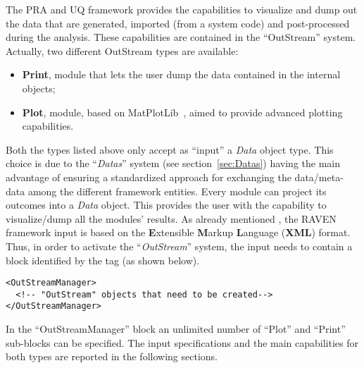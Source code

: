 The PRA and UQ framework provides the capabilities to visualize and dump out the
data that are generated, imported (from a system code) and post-processed during
the analysis.
%
These capabilities are contained in the ``OutStream'' system.
%
Actually, two different OutStream types are available:
\vspace{-5mm}
\begin{itemize}
  \itemsep0em
  \item \textbf{Print}, module that lets the user dump the data contained in the
  internal objects;
  \item \textbf{Plot}, module, based on MatPlotLib~\cite{MatPlotLib}, aimed to
  provide advanced plotting capabilities.
\end{itemize}
\vspace{-5mm}
Both the types listed above only accept as ``input'' a \textit{Data} object
type.
%
This choice is due to the ``\textit{Datas}'' system (see
section~\ref{sec:Datas}) having the main advantage of ensuring a standardized
approach for exchanging the data/meta-data among the different framework
entities.
%
Every module can project its outcomes into a \textit{Data} object.
%
This provides the user with the capability to visualize/dump all the modules'
results.
%
As already mentioned , the RAVEN
framework input is based on the \textbf{E}xtensible \textbf{M}arkup
\textbf{L}anguage (\textbf{XML}) format.
%
Thus, in order to activate the ``\textit{OutStream}'' system, the input needs to
contain a block identified by the  tag (as shown
below).

\begin{lstlisting}[style=XML]
<OutStreamManager>
  <!-- "OutStream" objects that need to be created-->
</OutStreamManager>
\end{lstlisting}

In the ``OutStreamManager'' block an unlimited number of ``Plot'' and ``Print''
sub-blocks can be specified.
%
The input specifications and the main capabilities for both types are reported
in the following sections.
%
%
